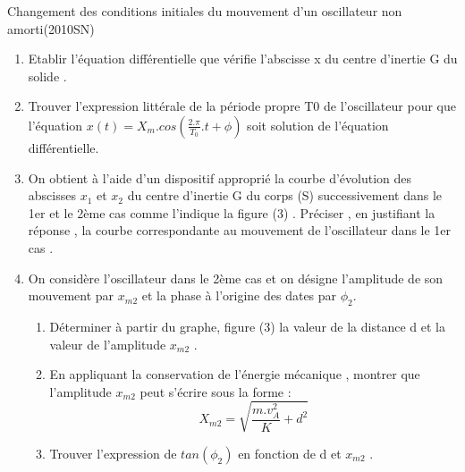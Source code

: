 \documentclass[12pt]{article}
\begin{document}
\begin{Box2}{Changement des conditions initiales du mouvement d’un oscillateur
  non amorti(2010SN)}
\begin{enumerate}
  \item Etablir l’équation différentielle que vérifie l’abscisse x du centre d’inertie G du solide .
  \item Trouver l’expression littérale de la période propre T0 de l’oscillateur pour que l’équation
    $x(t) = X_m.cos(\frac{2.\pi}{T_0}.t + \phi)$ soit solution de l’équation différentielle.
  \item On obtient à l’aide d’un dispositif approprié la courbe d’évolution des abscisses $x_1$ et $x_2$ du
centre d’inertie G du corps (S) successivement dans le 1er et le 2ème cas comme l’indique
la figure (3) .
Préciser , en justifiant la réponse , la courbe correspondante au mouvement de l’oscillateur dans
le 1er cas .
\item On considère l’oscillateur dans
le 2ème cas et on désigne l’amplitude
    de son mouvement par $x_{m2}$ et la phase
à l’origine des dates par $\phi_2$.
\begin{enumerate}
  \item Déterminer à partir du graphe,
figure (3) la valeur de la distance d
    et la valeur de l’amplitude $x_{m2}$ .
  \item En appliquant la conservation de
l’énergie mécanique , montrer que
    l’amplitude $x_{m2}$ peut s’écrire sous
    la forme : $$X_{m2} = \sqrt{\frac{m.v_A^2}{K} + d^2}$$
  \item Trouver l’expression de $tan(\phi_2)$ en fonction de d et $x_{m2}$ .
\end{enumerate}
\end{enumerate}

\end{Box2}
\end{document}
